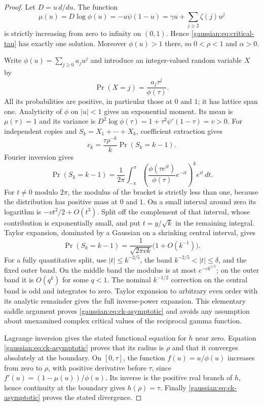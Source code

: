 \begin{proof}
Let $D=u\,d/du$.  The function
\[
 \mu(u)=D\log\phi(u)=-u\psi(1-u)
 =\gamma u+\sum_{j\ge2}\zeta(j)u^j
\]
is strictly increasing from zero to infinity on $(0,1)$.  Hence
\eqref{gaussian:eq:critical-tau} has exactly one solution.
Moreover $\phi(u)>1$ there, so $0<\rho<1$ and $\alpha>0$.

Write $\phi(u)=\sum_{j\ge0}a_ju^j$ and introduce an integer-valued random
variable $X$ by
\[
 \Pr(X=j)=\frac{a_j\tau^j}{\phi(\tau)}.
\]
All its probabilities are positive, in particular those at $0$ and $1$;
it has lattice span one.  Analyticity of $\phi$ on $|u|<1$ gives an
exponential moment.  Its mean is $\mu(\tau)=1$ and its variance is
$D^2\log\phi(\tau)=1+\tau^2\psi'(1-\tau)=v>0$.
For independent copies and $S_k=X_1+\cdots+X_k$, coefficient extraction gives
\begin{equation}
 c_k=\frac{\tau\rho^{-k}}k\Pr(S_k=k-1).
 \label{gaussian:eq:coefficient-probability}
\end{equation}
Fourier inversion gives
\[
 \Pr(S_k=k-1)=\frac1{2\pi}\int_{-\pi}^{\pi}
 \left(\frac{\phi(\tau e^{it})}{\phi(\tau)}e^{-it}\right)^k e^{it}\,dt.
\]
For $t\ne0$ modulo $2\pi$, the modulus of the bracket is strictly less
than one, because the distribution has positive mass at $0$ and $1$.
On a small interval around zero its logarithm is
$-vt^2/2+O(t^3)$.  Split off the complement of that interval, whose
contribution is exponentially small, and put $t=y/\sqrt{k}$ in the
remaining integral.  Taylor expansion, dominated by a Gaussian on a
shrinking central interval, gives
\[
 \Pr(S_k=k-1)=\frac1{\sqrt{2\pi vk}}\bigl(1+O(k^{-1})\bigr).
\]
For a fully quantitative split, use $|t|\le k^{-2/5}$, the band
$k^{-2/5}<|t|\le\delta$, and the fixed outer band.  On the middle
band the modulus is at most $e^{-c k^{1/5}}$; on the outer band it is
$O(q^k)$ for some $q<1$.  The nominal $k^{-1/2}$ correction on the
central band is odd and integrates to zero.  Taylor expansion to arbitrary
even order with its analytic remainder gives the full inverse-power expansion.  This elementary saddle argument proves
\eqref{gaussian:eq:ck-asymptotic} and avoids any assumption about unexamined complex
critical values of the reciprocal gamma function.

Lagrange inversion gives the stated functional equation for $h$ near zero.
Equation \eqref{gaussian:eq:ck-asymptotic} proves that its radius is $\rho$ and that
it converges absolutely at the boundary.  On $[0,\tau]$, the function
$f(u)=u/\phi(u)$ increases from zero to $\rho$, with positive derivative
before $\tau$, since $f'(u)=(1-\mu(u))/\phi(u)$.  Its inverse is the
positive real branch of $h$, hence continuity at the boundary gives
$h(\rho)=\tau$.  Finally \eqref{gaussian:eq:ck-asymptotic} proves the stated divergence.
\end{proof}


